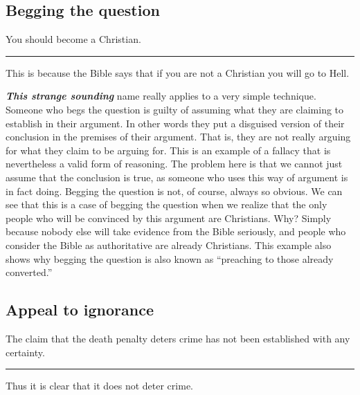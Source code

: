 \documentclass[]{book}
\makeatletter
\newenvironment{kframe}{%
\medskip{}
\setlength{\fboxsep}{.8em}
 \def\at@end@of@kframe{}%
 \ifinner\ifhmode%
  \def\at@end@of@kframe{\end{minipage}}%
  \begin{minipage}{\columnwidth}%
 \fi\fi%
 \def\FrameCommand##1{\hskip\@totalleftmargin \hskip-\fboxsep
 \colorbox{shadecolor}{##1}\hskip-\fboxsep
     \hskip-\linewidth \hskip-\@totalleftmargin \hskip\columnwidth}%
 \MakeFramed {\advance\hsize-\width
   \@totalleftmargin\z@ \linewidth\hsize
   \@setminipage}}%
 {\par\unskip\endMakeFramed%
 \at@end@of@kframe}
\newenvironment{rmdblock}[1]
  {
  \begin{itemize}
  \renewcommand{\labelitemi}{
    \raisebox{-.7\height}[0pt][0pt]{
      {\setkeys{Gin}{width=3em,keepaspectratio}\texttt{[image: img/\#1]}}
    }
  }
  \setlength{\fboxsep}{1em}
  \begin{kframe}
  \item
  }
  {
  \end{kframe}
  \end{itemize}
  }
\newenvironment{rmdwarning}
  {\begin{rmdblock}{warning}}
  {\end{rmdblock}}
\makeatother
\begin{document}
\hypertarget{begging-the-question}{%
\subsection*{Begging the question}\label{begging-the-question}}


\begin{rmdwarning}
You should become a Christian.

\begin{center}\rule{0.5\linewidth}{\linethickness}\end{center}

This is because the Bible says that if you are not a Christian you will
go to Hell.
\end{rmdwarning}

\textbf{\emph{This strange sounding}} name really applies to a very simple technique. Someone who begs the question is guilty of assuming what they are claiming to establish in their argument. In other words they put a disguised version of their conclusion in the premises of their argument. That is, they are not really arguing for what they claim to be arguing for. This is an example of a fallacy that is nevertheless a valid form of reasoning. The problem here is that we cannot just assume that the conclusion is true, as someone who uses this way of argument is in fact doing. Begging the question is not, of course, always so obvious. We can see that this is a case of begging the question when we realize that the only people who will be convinced by this argument are Christians. Why? Simply because nobody else will take evidence from the Bible seriously, and people who consider the Bible as authoritative are already Christians. This example also shows why begging the question is also known as ``preaching to those already converted.''

\hypertarget{appeal-to-ignorance}{%
\subsection*{Appeal to ignorance}\label{appeal-to-ignorance}}


\begin{rmdwarning}
The claim that the death penalty deters crime has not been established
with any certainty.

\begin{center}\rule{0.5\linewidth}{\linethickness}\end{center}

Thus it is clear that it does not deter crime.
\end{rmdwarning}
\end{document}
